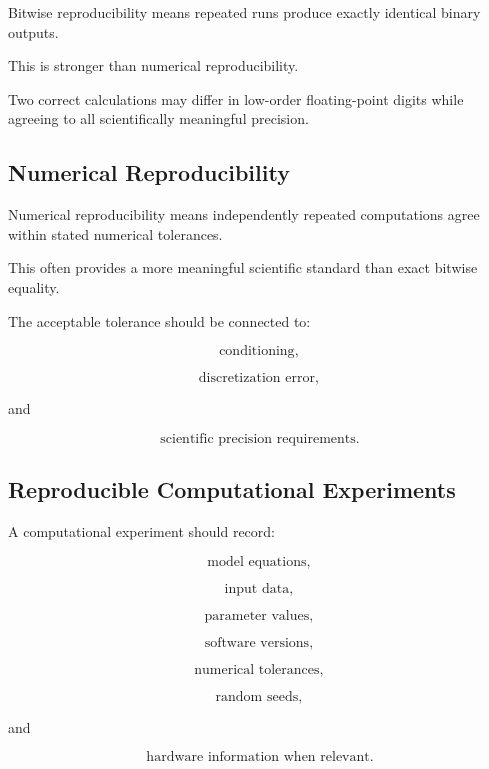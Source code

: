 Bitwise reproducibility means repeated runs produce exactly identical
binary outputs.

This is stronger than numerical reproducibility.

Two correct calculations may differ in low-order floating-point digits
while agreeing to all scientifically meaningful precision.

\subsection{Numerical Reproducibility}
\label{subsec:numerical-reproducibility}

Numerical reproducibility means independently repeated computations agree
within stated numerical tolerances.

This often provides a more meaningful scientific standard than exact
bitwise equality.

The acceptable tolerance should be connected to:

\[
\boxed{
\text{conditioning},
}
\]

\[
\boxed{
\text{discretization error},
}
\]

and

\[
\boxed{
\text{scientific precision requirements}.
}
\]

\subsection{Reproducible Computational Experiments}
\label{subsec:reproducible-computational-experiments}

A computational experiment should record:

\[
\boxed{
\text{model equations},
}
\]

\[
\boxed{
\text{input data},
}
\]

\[
\boxed{
\text{parameter values},
}
\]

\[
\boxed{
\text{software versions},
}
\]

\[
\boxed{
\text{numerical tolerances},
}
\]

\[
\boxed{
\text{random seeds},
}
\]

and

\[
\boxed{
\text{hardware information when relevant}.
}
\]

